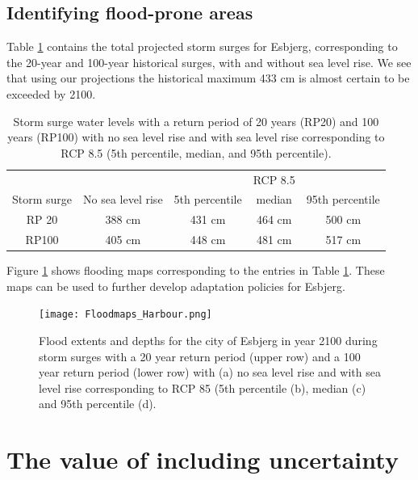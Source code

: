 \documentclass[draft,linenumbers]{agujournal}
\begin{document}
\subsection{Identifying flood-prone areas}
Table \ref{tab:stormsurge} contains the total projected storm surges for Esbjerg, corresponding to the 20-year and 100-year historical surges, with and without sea level rise. We see that using our projections the historical maximum 433 cm is almost certain to be exceeded by 2100.

\begin{table}

\begin{center}
\begin{tabular}[]{c | c | c c c}

&&&RCP 8.5&\\
Storm surge&No sea level rise&5th percentile&median&95th percentile\\
\hline
RP 20&388 cm&431 cm&464 cm& 500 cm\\
RP100&405 cm&448 cm& 481 cm& 517 cm\\
\hline
\end{tabular}
\end{center}
\caption{Storm surge water levels \citep{sealevel2012} with a return period of 20 years (RP20) and 100 years (RP100) with no sea level rise  and with sea level rise corresponding to RCP 8.5 (5th percentile, median, and 95th percentile).}
\label{tab:stormsurge}
\end{table} 

Figure \ref{fig:esbjerg} shows flooding maps corresponding to the entries in Table \ref{tab:stormsurge}. These maps can be used to further develop adaptation policies for Esbjerg.
\begin{figure}[!hbpt]
\begin{center}
\texttt{[image: Floodmaps\_Harbour.png]}
\caption{Flood extents and depths for the city of Esbjerg in year 2100 during storm surges with a 20 year return period (upper row) and a 100 year return period (lower row) with (a) no sea level rise and with sea level rise corresponding to RCP 85 (5th percentile (b), median (c) and 95th percentile (d). }
\label{fig:esbjerg}
\end{center}
\end{figure}


\section{The value of including uncertainty}
\label{unc}
\end{document}

